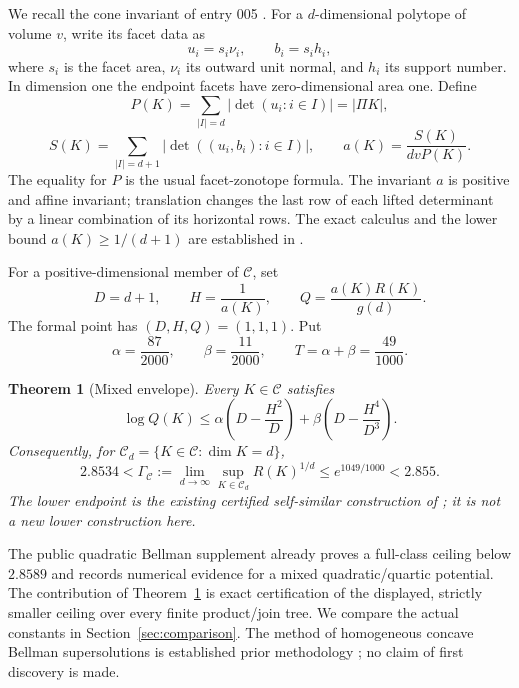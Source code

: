 \documentclass[11pt]{article}
\newtheorem{theorem}{Theorem}[section]
\theoremstyle{remark}
\newcommand{\CC}{\mathcal C}
\begin{document}
We recall the cone invariant of entry 005 \cite{calculus}. For a $d$-dimensional polytope of volume $v$, write its facet data as
\[
 u_i=s_i\nu_i,\qquad b_i=s_i h_i,
\]
where $s_i$ is the facet area, $\nu_i$ its outward unit normal, and $h_i$ its support number. In dimension one the endpoint facets have zero-dimensional area one. Define
\[
 P(K)=\sum_{|I|=d}|\det(u_i:i\in I)|=|\Pi K|,
\]
\[
 S(K)=\sum_{|I|=d+1}|\det((u_i,b_i):i\in I)|,
 \qquad a(K)=\frac{S(K)}{dvP(K)}.
\]
The equality for $P$ is the usual facet-zonotope formula. The invariant $a$ is positive and affine invariant; translation changes the last row of each lifted determinant by a linear combination of its horizontal rows. The exact calculus and the lower bound $a(K)\ge1/(d+1)$ are established in \cite{calculus}.

For a positive-dimensional member of $\CC$, set
\begin{equation}\label{eq:coordinates}
 D=d+1,\qquad H=\frac1{a(K)},\qquad Q=\frac{a(K)R(K)}{g(d)}.
\end{equation}
The formal point has $(D,H,Q)=(1,1,1)$. Put
\begin{equation}\label{eq:constants}
 \alpha=\frac{87}{2000},\qquad \beta=\frac{11}{2000},\qquad
 T=\alpha+\beta=\frac{49}{1000}.
\end{equation}

\begin{theorem}[Mixed envelope]\label{thm:main}
Every $K\in\CC$ satisfies
\begin{equation}\label{eq:main}
 \log Q(K)\le
 \alpha\left(D-\frac{H^2}{D}\right)
 +\beta\left(D-\frac{H^4}{D^3}\right).
\end{equation}
Consequently, for $\CC_d=\{K\in\CC:\dim K=d\}$,
\begin{equation}\label{eq:rate}
 2.8534<\Gamma_{\CC}:=
 \lim_{d\to\infty}\sup_{K\in\CC_d}R(K)^{1/d}
 \le e^{1049/1000}<2.855.
\end{equation}
The lower endpoint is the existing certified self-similar construction of \cite{calculus}; it is not a new lower construction here.
\end{theorem}

The public quadratic Bellman supplement \cite{quadratic} already proves a full-class ceiling below $2.8589$ and records numerical evidence for a mixed quadratic/quartic potential. The contribution of Theorem~\ref{thm:main} is exact certification of the displayed, strictly smaller ceiling over every finite product/join tree. We compare the actual constants in Section~\ref{sec:comparison}. The method of homogeneous concave Bellman supersolutions is established prior methodology \cite{tree,hessian,isoperimetric}; no claim of first discovery is made.
\end{document}
